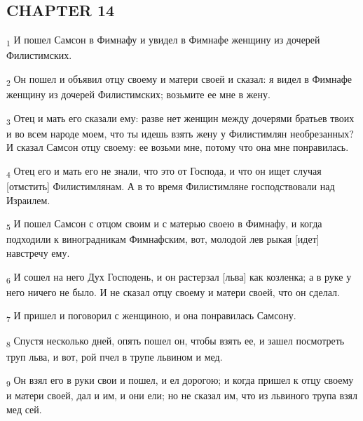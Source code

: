 \subsection{CHAPTER 14}
\begin{tcolorbox}
\textsubscript{1} И пошел Самсон в Фимнафу и увидел в Фимнафе женщину из дочерей Филистимских.
\end{tcolorbox}
\begin{tcolorbox}
\textsubscript{2} Он пошел и объявил отцу своему и матери своей и сказал: я видел в Фимнафе женщину из дочерей Филистимских; возьмите ее мне в жену.
\end{tcolorbox}
\begin{tcolorbox}
\textsubscript{3} Отец и мать его сказали ему: разве нет женщин между дочерями братьев твоих и во всем народе моем, что ты идешь взять жену у Филистимлян необрезанных? И сказал Самсон отцу своему: ее возьми мне, потому что она мне понравилась.
\end{tcolorbox}
\begin{tcolorbox}
\textsubscript{4} Отец его и мать его не знали, что это от Господа, и что он ищет случая [отмстить] Филистимлянам. А в то время Филистимляне господствовали над Израилем.
\end{tcolorbox}
\begin{tcolorbox}
\textsubscript{5} И пошел Самсон с отцом своим и с матерью своею в Фимнафу, и когда подходили к виноградникам Фимнафским, вот, молодой лев рыкая [идет] навстречу ему.
\end{tcolorbox}
\begin{tcolorbox}
\textsubscript{6} И сошел на него Дух Господень, и он растерзал [льва] как козленка; а в руке у него ничего не было. И не сказал отцу своему и матери своей, что он сделал.
\end{tcolorbox}
\begin{tcolorbox}
\textsubscript{7} И пришел и поговорил с женщиною, и она понравилась Самсону.
\end{tcolorbox}
\begin{tcolorbox}
\textsubscript{8} Спустя несколько дней, опять пошел он, чтобы взять ее, и зашел посмотреть труп льва, и вот, рой пчел в трупе львином и мед.
\end{tcolorbox}
\begin{tcolorbox}
\textsubscript{9} Он взял его в руки свои и пошел, и ел дорогою; и когда пришел к отцу своему и матери своей, дал и им, и они ели; но не сказал им, что из львиного трупа взял мед сей.
\end{tcolorbox}
